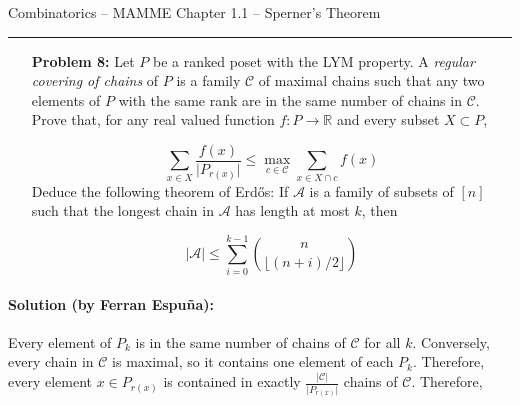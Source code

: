 \documentclass{amsart}
\theoremstyle{plain}
\theoremstyle{definition}
\newcommand{\R}{\mathbb{R}}
\begin{document}
    {\Large Combinatorics -- MAMME}
    {\Large Chapter 1.1 -- Sperner's Theorem}

    \vspace{0.5cm}

    \hrule

    \vspace{0.5cm}

    \begin{enumerate}


    \item[\textbf{Problem 8:}] Let $P$ be a ranked poset with the LYM property.
    A \emph{regular covering of chains} of $P$ is a family $\mathcal{C}$ of maximal chains such that
    any two elements of $P$ with the same rank are in the same number of chains in $\mathcal{C}$.
    Prove that, for any real valued function $f : P \longrightarrow \mathbb{R}$ and every subset $X \subset P$,

    \begin{equation}\label{eq:whatwewant}
    \sum_{x \in X} \frac{f(x)}{  \lvert P_{r(x)} \rvert } \leq \max_{c \in \mathcal{C}} \sum_{x \in X \cap c} f(x)
    \end{equation}
    Deduce the following theorem of Erd\H{o}s: If $\mathcal{A}$ is a family of subsets of $[n]$ such that
    the longest chain in $\mathcal{A}$ has length at most $k$, then

    \begin{equation}\label{eq:erdos}
    \lvert \mathcal{A} \rvert \leq \sum_{i = 0}^{k-1}\binom{n}{\lfloor (n+i)/2 \rfloor}
    \end{equation}

    \noindent [Hint: For the first inequality consider the function F: $\mathcal{C} \to \R $ definded as $F(c) = \sum_{x \in c} f(x)$ and use double counting.
    For the second inequality, chose $f(x) = \lvert P_{r(x)} \rvert$.]
    \end{enumerate}

    \paragraph{\textbf{Solution (by Ferran Espuña):}} Every element of $P_k$
    is in the same number of chains of $\mathcal{C}$ for all $k$.
    Conversely, every
    chain in $\mathcal{C}$ is maximal, so it contains one element of each $P_k$.
    Therefore, every element $x \in P_{r(x)}$
    is contained in exactly $\frac{\lvert \mathcal{C} \rvert}{\lvert P_{r(x)} \rvert}$ chains of $\mathcal{C}$.
    Therefore,
\end{document}
